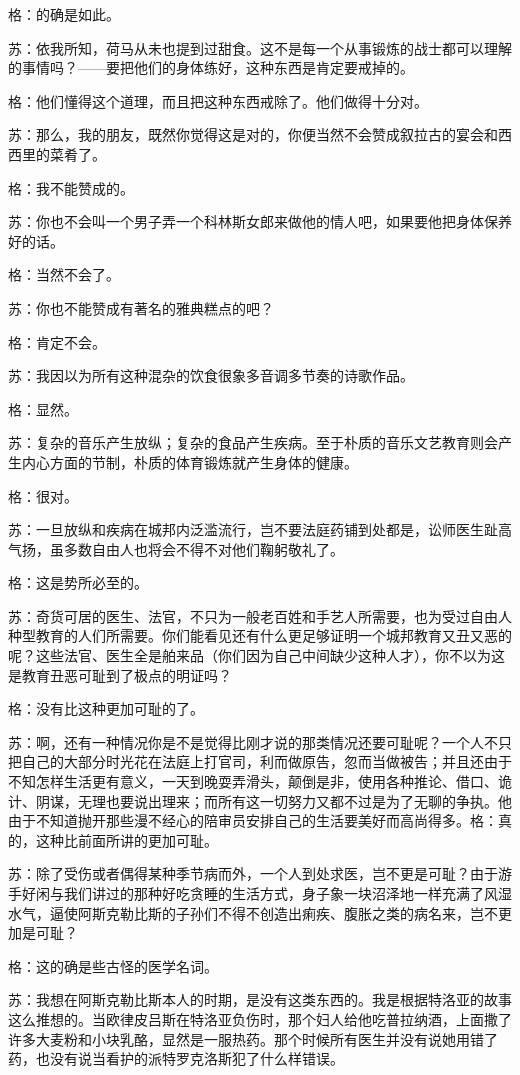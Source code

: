 \documentclass[11pt,oneside]{book}
\begin{document}
\begin{common-format}
格：的确是如此。

苏：依我所知，荷马从未也提到过甜食。这不是每一个从事锻炼的战士都可以理解的事情吗？——要把他们的身体练好，这种东西是肯定要戒掉的。

格：他们懂得这个道理，而且把这种东西戒除了。他们做得十分对。

苏：那么，我的朋友，既然你觉得这是对的，你便当然不会赞成叙拉古的宴会和西西里的菜肴了。

格：我不能赞成的。

苏：你也不会叫一个男子弄一个科林斯女郎来做他的情人吧，如果要他把身体保养好的话。

格：当然不会了。

苏：你也不能赞成有著名的雅典糕点的吧？

格：肯定不会。

苏：我因以为所有这种混杂的饮食很象多音调多节奏的诗歌作品。

格：显然。

苏：复杂的音乐产生放纵；复杂的食品产生疾病。至于朴质的音乐文艺教育则会产生内心方面的节制，朴质的体育锻炼就产生身体的健康。

格：很对。

苏：一旦放纵和疾病在城邦内泛滥流行，岂不要法庭药铺到处都是，讼师医生趾高气扬，虽多数自由人也将会不得不对他们鞠躬敬礼了。

格：这是势所必至的。

苏：奇货可居的医生、法官，不只为一般老百姓和手艺人所需要，也为受过自由人种型教育的人们所需要。你们能看见还有什么更足够证明一个城邦教育又丑又恶的呢？这些法官、医生全是舶来品（你们因为自己中间缺少这种人才），你不以为这是教育丑恶可耻到了极点的明证吗？

格：没有比这种更加可耻的了。

苏：啊，还有一种情况你是不是觉得比刚才说的那类情况还要可耻呢？一个人不只把自己的大部分时光花在法庭上打官司，利而做原告，忽而当做被告；并且还由于不知怎样生活更有意义，一天到晚耍弄滑头，颠倒是非，使用各种推论、借口、诡计、阴谋，无理也要说出理来；而所有这一切努力又都不过是为了无聊的争执。他由于不知道抛开那些漫不经心的陪审员安排自己的生活要美好而高尚得多。格：真的，这种比前面所讲的更加可耻。

苏：除了受伤或者偶得某种季节病而外，一个人到处求医，岂不更是可耻？由于游手好闲与我们讲过的那种好吃贪睡的生活方式，身子象一块沼泽地一样充满了风湿水气，逼使阿斯克勒比斯的子孙们不得不创造出痢疾、腹胀之类的病名来，岂不更加是可耻？

格：这的确是些古怪的医学名词。

苏：我想在阿斯克勒比斯本人的时期，是没有这类东西的。我是根据特洛亚的故事这么推想的。当欧律皮吕斯在特洛亚负伤时，那个妇人给他吃普拉纳酒，上面撒了许多大麦粉和小块乳酪，显然是一服热药。那个时候所有医生并没有说她用错了药，也没有说当看护的派特罗克洛斯犯了什么样错误。


\end{common-format}
\end{document}
